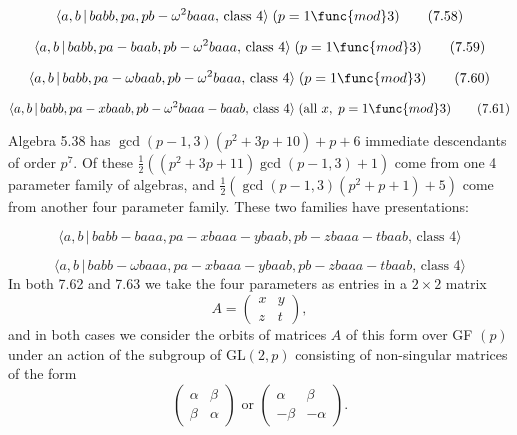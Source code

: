 \documentclass[10pt]{article}
\begin{document}
\begin{equation}
\langle a,b\,|\,babb,pa,pb-\omega ^{2}baaa,\,\text{class }4\rangle \;(p=1%
\func{mod}3)  \tag{7.58}
\end{equation}

\begin{equation}
\langle a,b\,|\,babb,pa-baab,pb-\omega ^{2}baaa,\,\text{class }4\rangle
\;(p=1\func{mod}3)  \tag{7.59}
\end{equation}

\begin{equation}
\langle a,b\,|\,babb,pa-\omega baab,pb-\omega ^{2}baaa,\,\text{class }%
4\rangle \;(p=1\func{mod}3)  \tag{7.60}
\end{equation}

\begin{equation}
\langle a,b\,|\,babb,pa-xbaab,pb-\omega ^{2}baaa-baab,\,\text{class }%
4\rangle \;(\text{all }x,\;p=1\func{mod}3)  \tag{7.61}
\end{equation}

Algebra 5.38 has$\allowbreak $ $\gcd (p-1,3)(p^{2}+3p+10)+p+6$ immediate
descendants of order $p^{7}$. Of these $\frac{1}{2}((p^{2}+3p+11)\gcd
(p-1,3)+1)$ come from one 4 parameter family of algebras, and $\frac{1}{2}%
(\gcd (p-1,3)(p^{2}+p+1)+5)$ come from another four parameter family. These
two families have presentations:

\begin{equation}
\langle a,b\,|\,babb-baaa,pa-xbaaa-ybaab,pb-zbaaa-tbaab,\,\text{class }%
4\rangle  \tag{7.62}
\end{equation}

\begin{equation}
\langle a,b\,|\,babb-\omega baaa,pa-xbaaa-ybaab,pb-zbaaa-tbaab,\,\text{class 
}4\rangle  \tag{7.63}
\end{equation}%
In both 7.62 and 7.63 we take the four parameters as entries in a $2\times 2$
matrix%
\[
A=\left( 
\begin{array}{cc}
x & y \\ 
z & t%
\end{array}%
\right) , 
\]%
and in both cases we consider the orbits of matrices $A$ of this form over GF%
$(p)$ under an action of the subgroup of GL$(2,p)$ consisting of
non-singular matrices of the form%
\[
\left( 
\begin{array}{ll}
\alpha & \beta \\ 
\beta & \alpha%
\end{array}%
\right) \text{ or }\left( 
\begin{array}{ll}
\alpha & \beta \\ 
-\beta & -\alpha%
\end{array}%
\right) . 
\]
\end{document}
